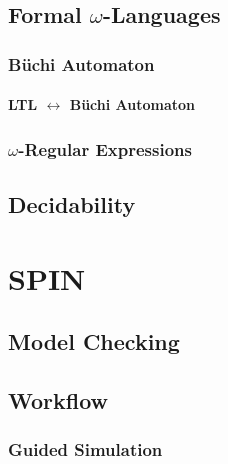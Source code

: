 \documentclass[a4paper, 11pt, accentcolor = tud3b]{tudreport}
\begin{document}
        \section{Formal \(\omega\)-Languages} %

            \subsection{Büchi Automaton} %

                \subsubsection{LTL \(\leftrightarrow\) Büchi Automaton} %

            \subsection{\(\omega\)-Regular Expressions} %

        \section{Decidability} %

    \chapter{SPIN} %

        \section{Model Checking} %

        \section{Workflow} %

            \subsection{Guided Simulation} %
\end{document}
